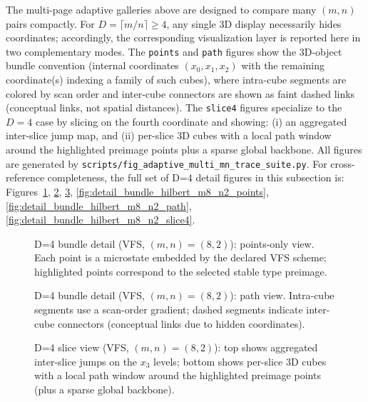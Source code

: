 \noindent
The multi-page adaptive galleries above are designed to compare many $(m,n)$ pairs compactly.
For $D=\lceil m/n\rceil\ge 4$, any single 3D display necessarily hides coordinates; accordingly, the corresponding visualization layer is reported here in two complementary modes.
The \texttt{points} and \texttt{path} figures show the 3D-object bundle convention (internal coordinates $(x_0,x_1,x_2)$ with the remaining coordinate(s) indexing a family of such cubes), where intra-cube segments are colored by scan order and inter-cube connectors are shown as faint dashed links (conceptual links, not spatial distances).
The \texttt{slice4} figures specialize to the $D=4$ case by slicing on the fourth coordinate and showing: (i) an aggregated inter-slice jump map, and (ii) per-slice 3D cubes with a local path window around the highlighted preimage points plus a sparse global backbone.
All figures are generated by \texttt{scripts/fig\_adaptive\_multi\_mn\_trace\_suite.py}.
\AuditTag For cross-reference completeness, the full set of D=4 detail figures in this subsection is:
Figures~\ref{fig:detail_bundle_vfs_m8_n2_points}, \ref{fig:detail_bundle_vfs_m8_n2_path}, \ref{fig:detail_bundle_vfs_m8_n2_slice4},
\ref{fig:detail_bundle_hilbert_m8_n2_points}, \ref{fig:detail_bundle_hilbert_m8_n2_path}, \ref{fig:detail_bundle_hilbert_m8_n2_slice4}.

\begin{figure}[H]
\centering
{}
\caption{D=4 bundle detail (VFS, $(m,n)=(8,2)$): points-only view. Each point is a microstate embedded by the declared VFS scheme; highlighted points correspond to the selected stable type preimage.}
\label{fig:detail_bundle_vfs_m8_n2_points}
\end{figure}

\begin{figure}[H]
\centering
{}
\caption{D=4 bundle detail (VFS, $(m,n)=(8,2)$): path view. Intra-cube segments use a scan-order gradient; dashed segments indicate inter-cube connectors (conceptual links due to hidden coordinates).}
\label{fig:detail_bundle_vfs_m8_n2_path}
\end{figure}

\begin{figure}[H]
\centering
{}
\caption{D=4 slice view (VFS, $(m,n)=(8,2)$): top shows aggregated inter-slice jumps on the $x_3$ levels; bottom shows per-slice 3D cubes with a local path window around the highlighted preimage points (plus a sparse global backbone).}
\label{fig:detail_bundle_vfs_m8_n2_slice4}
\end{figure}

